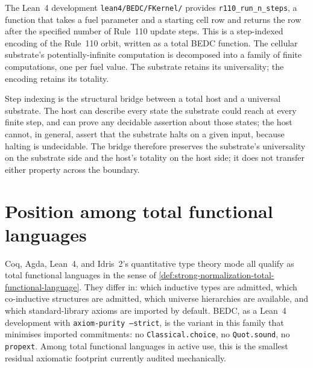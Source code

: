 \begin{example}
\label{ex:strong-normalization-rule110-evaluator-in-bedc}
The Lean~4 development \texttt{lean4/BEDC/FKernel/} provides \texttt{r110\_run\_n\_steps}, a function that takes a fuel parameter and a starting cell row and returns the row after the specified number of Rule~110 update steps. This is a step-indexed encoding of the Rule~110 orbit, written as a total BEDC function. The cellular substrate's potentially-infinite computation is decomposed into a family of finite computations, one per fuel value. The substrate retains its universality; the encoding retains its totality.
\end{example}

\begin{principle}
\label{prin:strong-normalization-step-indexing-as-bridge}
Step indexing is the structural bridge between a total host and a universal substrate. The host can describe every state the substrate could reach at every finite step, and can prove any decidable assertion about those states; the host cannot, in general, assert that the substrate halts on a given input, because halting is undecidable. The bridge therefore preserves the substrate's universality on the substrate side and the host's totality on the host side; it does not transfer either property across the boundary.
\end{principle}

\section{Position among total functional languages}
\label{sec:strong-normalization-position-among-totals}

\begin{remark}
\label{rem:strong-normalization-coq-agda-lean-idris}
Coq, Agda, Lean~4, and Idris~2's quantitative type theory mode all qualify as total functional languages in the sense of \autoref{def:strong-normalization-total-functional-language}. They differ in: which inductive types are admitted, which co-inductive structures are admitted, which universe hierarchies are available, and which standard-library axioms are imported by default. BEDC, as a Lean~4 development with \texttt{axiom-purity --strict}, is the variant in this family that minimises imported commitments: no \texttt{Classical.choice}, no \texttt{Quot.sound}, no \texttt{propext}. Among total functional languages in active use, this is the smallest residual axiomatic footprint currently audited mechanically.
\end{remark}

